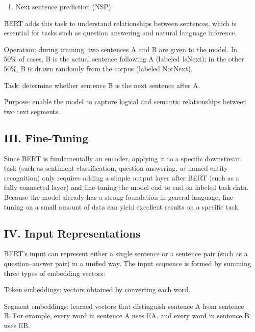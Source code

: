\begin{enumerate}
\def\labelenumi{\arabic{enumi}.}
\setcounter{enumi}{1}
\tightlist
\item
  Next sentence prediction (NSP)
\end{enumerate}

BERT adds this task to understand relationships between sentences, which is essential for tasks such as question answering and natural language inference.

Operation: during training, two sentences A and B are given to the model. In 50\% of cases, B is the actual sentence following A (labeled IsNext); in the other 50\%, B is drawn randomly from the corpus (labeled NotNext).

Task: determine whether sentence B is the next sentence after A.

Purpose: enable the model to capture logical and semantic relationships between two text segments.

\hypertarget{iii.-fine-tuning}{%
\subsection{III. Fine-Tuning}\label{iii.-fine-tuning}}

Since BERT is fundamentally an encoder, applying it to a specific downstream task (such as sentiment classification, question answering, or named entity recognition) only requires adding a simple output layer after BERT (such as a fully connected layer) and fine-tuning the model end to end on labeled task data. Because the model already has a strong foundation in general language, fine-tuning on a small amount of data can yield excellent results on a specific task.

\hypertarget{iv.-input-representations}{%
\subsection{IV. Input Representations}\label{iv.-input-representations}}

BERT's input can represent either a single sentence or a sentence pair (such as a question--answer pair) in a unified way. The input sequence is formed by summing three types of embedding vectors:

Token embeddings: vectors obtained by converting each word.

Segment embeddings: learned vectors that distinguish sentence A from sentence B. For example, every word in sentence A uses EA, and every word in sentence B uses EB.

